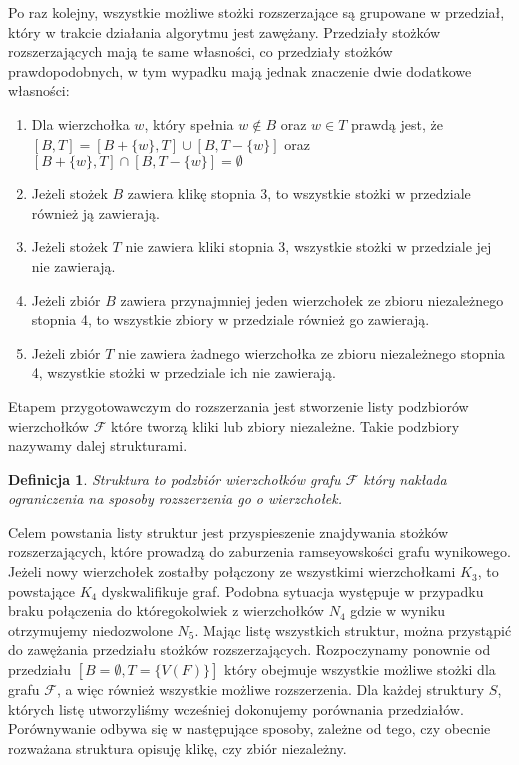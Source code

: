 \documentclass[11pt]{article}
\newtheorem{definition}{Definicja}[section]
\begin{document}
Po raz kolejny, wszystkie możliwe stożki rozszerzające są grupowane w przedział, który w trakcie działania algorytmu jest zawężany. Przedziały stożków rozszerzających mają te same własności, co przedziały stożków prawdopodobnych, w tym wypadku mają jednak znaczenie dwie dodatkowe własności:

\begin{enumerate}
\item Dla wierzchołka $w$, który spełnia $w \notin B$ oraz $w\in T$ prawdą jest, że $[B, T] = [B + \{ w\}, T] \cup [B , T - \{ w\}]$ oraz $[B +\{ w\}, T] \cap [B , T - \{ w\}] = \emptyset$

\item Jeżeli stożek $B$ zawiera klikę stopnia 3, to wszystkie stożki w przedziale również ją zawierają. 

\item Jeżeli stożek $T$ nie zawiera kliki stopnia 3, wszystkie stożki w przedziale jej nie zawierają.

																													  
				 
\item Jeżeli zbiór $B$ zawiera przynajmniej jeden wierzchołek ze zbioru niezależnego stopnia 4, to wszystkie zbiory w przedziale również go zawierają. 

\item Jeżeli zbiór $T$ nie zawiera żadnego wierzchołka ze zbioru niezależnego stopnia 4, wszystkie stożki w przedziale ich nie zawierają.
\end {enumerate}



Etapem przygotowawczym do rozszerzania jest stworzenie listy podzbiorów wierzchołków $\mathcal{F}$ które tworzą kliki lub zbiory niezależne. Takie podzbiory nazywamy dalej strukturami.
\begin{definition} Struktura to podzbiór wierzchołków grafu $\mathcal{F}$ który nakłada ograniczenia na sposoby rozszerzenia go o wierzchołek.
\end{definition}
Celem powstania listy struktur jest przyspieszenie znajdywania stożków rozszerzających, które prowadzą do zaburzenia ramseyowskości grafu wynikowego. Jeżeli nowy wierzchołek zostałby połączony ze wszystkimi wierzchołkami $K_3$, to powstające $K_4$ dyskwalifikuje graf. Podobna sytuacja występuje w przypadku braku połączenia do któregokolwiek z wierzchołków $N_4$ gdzie w wyniku otrzymujemy niedozwolone $N_5$. 
Mając listę wszystkich struktur, można przystąpić do zawężania przedziału stożków rozszerzających. Rozpoczynamy ponownie od przedziału $[B = \emptyset, T = \{V(F)\} ]$ który obejmuje wszystkie możliwe stożki dla grafu $\mathcal{F}$, a więc również wszystkie możliwe rozszerzenia. Dla każdej struktury $S$, których listę utworzyliśmy wcześniej dokonujemy porównania przedziałów. Porównywanie odbywa się w następujące sposoby, zależne od tego, czy obecnie rozważana struktura opisuję klikę, czy zbiór niezależny.
\end{document}
